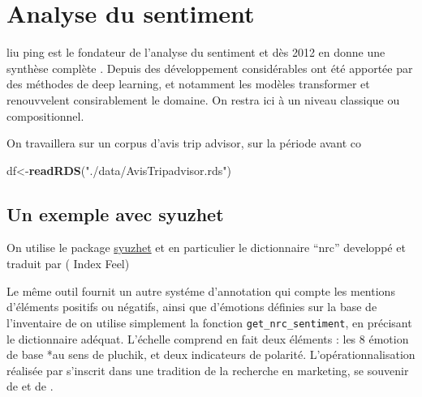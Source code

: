 \documentclass[
]{book}
\newenvironment{Shaded}{\begin{snugshade}}{\end{snugshade}}
\newcommand{\KeywordTok}[1]{\textcolor[rgb]{0.13,0.29,0.53}{\textbf{#1}}}
\newcommand{\NormalTok}[1]{#1}
\newcommand{\StringTok}[1]{\textcolor[rgb]{0.31,0.60,0.02}{#1}}
\begin{document}
\hypertarget{analyse-du-sentiment}{%
\chapter{Analyse du sentiment}\label{analyse-du-sentiment}}

liu ping est le fondateur de l'analyse du sentiment et dès 2012 en donne une synthèse complète \citep{liu_sentiment_2012} . Depuis des développement considérables ont été apportée par des méthodes de deep learning, et notamment les modèles transformer et renouvvelent consirablement le domaine. On restra ici à un niveau classique ou compositionnel.

On travaillera sur un corpus d'avis trip advisor, sur la période avant co

\begin{Shaded}
\begin{Highlighting}[]
\NormalTok{df<-}\KeywordTok{readRDS}\NormalTok{(}\StringTok{"./data/AvisTripadvisor.rds"}\NormalTok{)}
\end{Highlighting}
\end{Shaded}

\hypertarget{un-exemple-avec-syuzhet}{%
\section{Un exemple avec syuzhet}\label{un-exemple-avec-syuzhet}}

On utilise le package \href{https://www.rdocumentation.org/packages/syuzhet/versions/1.0.4}{syuzhet} et en particulier le dictionnaire ``nrc'' developpé et traduit par \citet{mohammad_crowdsourcing_2013} ( Index Feel)

Le même outil fournit un autre systéme d'annotation qui compte les mentions d'éléments positifs ou négatifs, ainsi que d'émotions définies sur la base de l'inventaire de \citet{plutchik_psychoevolutionary_1982} on utilise simplement la fonction \texttt{get\_nrc\_sentiment}, en précisant le dictionnaire adéquat. L'échelle comprend en fait deux éléments : les 8 émotion de base *au sens de pluchik, et deux indicateurs de polarité.
L'opérationnalisation réalisée par \citet{mohammad_crowdsourcing_2013} s'inscrit dans une tradition de la recherche en marketing, se souvenir de \citet{havlena_varieties_1986} et de \citet{westbrook_dimensionality_1991}.
\end{document}
